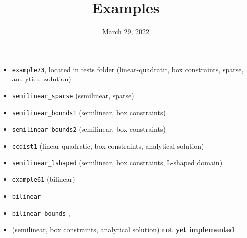 \documentclass{scrartcl}
\title{Examples}
\date{March 29, 2022}
\begin{document}
\maketitle

\begin{itemize}
	\item \texttt{example73}, located in tests folder
	(linear-quadratic, box constraints, sparse, analytical solution) 
	\cite{Wachsmuth2011}
	\item \texttt{semilinear\_sparse}
	(semilinear, sparse) 
	\cite{DelosReyes2015}
	\item \texttt{semilinear\_bounds1}
	(semilinear, box constraints)
	 \cite{Ulbrich2011}
	\item 
	\texttt{semilinear\_bounds2} 
	(semilinear, box constraints) 
	\cite{Hintermueller2004}
	\item \texttt{ccdist1} 
	(linear-quadratic, box constraints, analytical solution) 
	\cite{OPTPDE,Herzog2014,Troeltzsch2010a}
	\item \texttt{semilinear\_lshaped} 
	(semilinear, box constraints, L-shaped domain)
	\cite{Garries2019}
	\item \texttt{example61} 
	(bilinear) 
	\cite{Kunisch2010}
	
	\item \texttt{bilinear}
	\cite{Vallejos2008,Borzi2011}
	
	\item \texttt{bilinear\_bounds}
	\cite{Vallejos2010},
	\cite[pp.\ 133--134]{Borzi2011}
	
	\item 
	(semilinear, box constraints, analytical solution) 
	\cite{Chen2009}
	\textbf{not  yet implemented}
\end{itemize}



 
\end{document}
